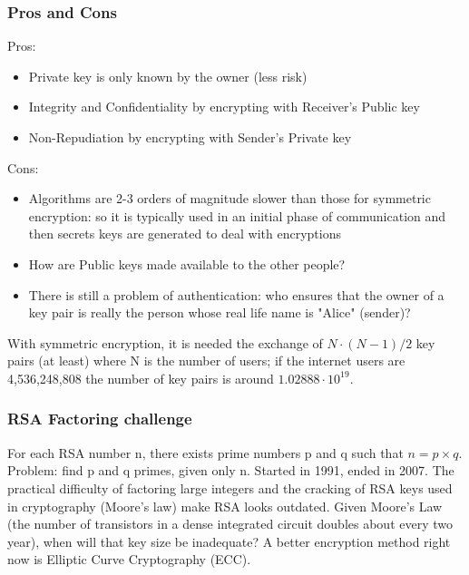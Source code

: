 \documentclass[a4paper, 10pt, titlepage]{article}
\begin{document}
\subsubsection{Pros and Cons}
Pros:
\begin{itemize}
\item Private key is only known by the owner (less risk)
\item Integrity and Confidentiality by encrypting with Receiver’s Public key
\item Non-Repudiation by encrypting with Sender’s Private key
\end{itemize}
Cons:
\begin{itemize}
\item Algorithms are 2-3 orders of magnitude slower than those for symmetric encryption: so it is typically used in an initial phase of communication and then secrets keys are generated to deal with encryptions
\item How are Public keys made available to the other people?
\item There is still a problem of authentication: who ensures that the owner of a key pair is really the person whose real life name is "Alice" (sender)?
\end{itemize}
With symmetric encryption, it is needed the exchange of $N \cdot (N-1)/2$ key pairs (at least) where N is the number of users; if the internet users are 4,536,248,808 the number of key pairs is around $1.02888 \cdot 10^{19}$.

\subsubsection*{RSA Factoring challenge}
For each RSA number n, there exists prime numbers p and q such that $n = p \times q$. Problem: find p and q primes, given only n.
Started in 1991, ended in 2007. The practical difficulty of factoring large integers and the cracking of RSA keys used in cryptography (Moore's law) make RSA looks outdated. Given Moore’s Law (the number of transistors in a dense integrated circuit doubles about every two year), when will that key size be inadequate?
A better encryption method right now is Elliptic Curve Cryptography (ECC).
\end{document}
